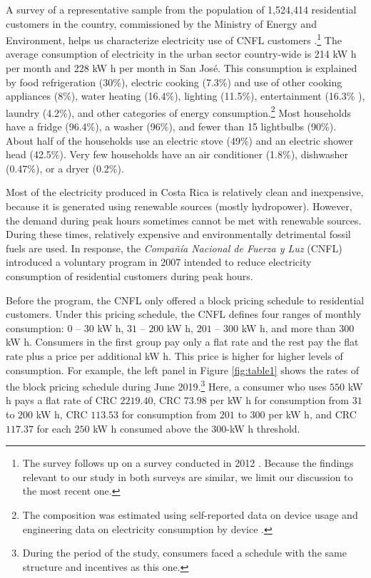 \documentclass[12pt]{article}
\begin{document}
A survey of a representative sample from the population of 1,524,414 residential customers in the country, commissioned by the Ministry of Energy and Environment, helps us characterize electricity use of CNFL customers \citep{ministeriodeambienteyenergiaEstudioParaCaracterizacion2019}.\footnote{ The survey follows up on a survey conducted in 2012 \citep{ministeriodeambienteyenergiaEncuestaConsumoEnergetico2012}. Because the findings relevant to our study in both surveys are similar, we limit our discussion to the most recent one.} The average consumption of electricity in the urban sector country-wide is 214 kW h per month and 228 kW h per month in San José. This consumption is explained by food refrigeration (30\%),  electric cooking (7.3\%) and use of other cooking appliances (8\%), water heating (16.4\%), lighting (11.5\%), entertainment (16.3\% ), laundry (4.2\%), and other categories of energy consumption.\footnote{The composition was estimated using self-reported data on device usage and engineering data on electricity consumption by device \citep{ministeriodeambienteyenergiaEstudioParaCaracterizacion2019}.} Most households have a fridge (96.4\%), a washer (96\%), and fewer than 15 lightbulbs (90\%). About half of the households use an electric stove (49\%) and an electric shower head (42.5\%). Very few households have an air conditioner (1.8\%), dishwasher (0.47\%), or a dryer (0.2\%).

Most of the electricity produced in Costa Rica is relatively clean and inexpensive, because it is generated using renewable sources (mostly hydropower). However, the demand during peak hours sometimes cannot be met with renewable sources. During these times, relatively expensive and environmentally detrimental fossil fuels are used. In response, the \emph{Compañía Nacional de Fuerza y Luz} (CNFL) introduced a voluntary program in 2007 intended to reduce electricity consumption of residential customers during peak hours.

Before the program, the CNFL only offered a block pricing schedule to residential customers. Under this pricing schedule, the CNFL defines four ranges of monthly consumption: $0$ – $30$ kW h, $31$ – $200$ kW h, $201$ – $300$ kW h, and more than $300$ kW h. Consumers in the first group pay only a flat rate and the rest pay the flat rate plus a price per additional kW h. This price is higher for higher levels of consumption. For example, the left panel in Figure \ref{fig:table1} shows the rates of the block pricing schedule during June 2019.\footnote{During the period of the study, consumers faced a schedule with the same structure and incentives as this one.} Here, a consumer who uses $550$ kW h pays a flat rate of  CRC $2219.40$, CRC $73.98$ per kW h for consumption from $31$ to $200$ kW h, CRC $113.53$ for consumption from $201$ to $300$ per kW h, and CRC $117.37$ for each $250$ kW h consumed above the $300$-kW h threshold.
\end{document}
